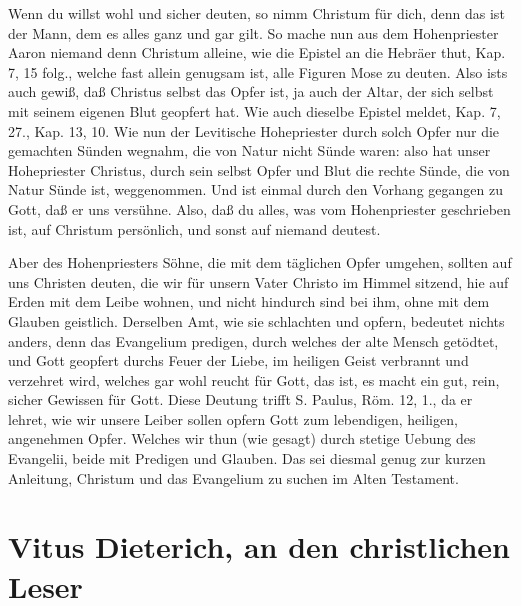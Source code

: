 Wenn du willst wohl und sicher deuten, so nimm Christum für dich, denn das ist der Mann, dem es alles ganz und gar gilt. So mache nun aus dem Hohenpriester Aaron niemand denn Christum alleine, wie die Epistel an die Hebräer thut, Kap. 7, 15 folg., welche fast allein genugsam ist, alle Figuren Mose zu deuten. Also ists auch gewiß, daß Christus selbst das Opfer ist, ja auch der Altar, der sich selbst mit seinem eigenen Blut geopfert hat. Wie auch dieselbe Epistel meldet, Kap. 7, 27., Kap. 13, 10. Wie nun der Levitische Hohepriester durch solch Opfer nur die gemachten Sünden wegnahm, die von Natur nicht Sünde waren: also hat unser Hohepriester Christus, durch sein selbst Opfer und Blut die rechte Sünde, die von Natur Sünde ist, weggenommen. Und ist einmal durch den Vorhang gegangen zu Gott, daß er uns versühne. Also, daß du alles, was vom Hohenpriester geschrieben ist, auf Christum persönlich, und sonst auf niemand deutest.

Aber des Hohenpriesters Söhne, die mit dem täglichen Opfer umgehen, sollten auf uns Christen deuten, die wir für unsern Vater Christo im Himmel sitzend, hie auf Erden mit dem Leibe wohnen, und nicht hindurch sind bei ihm, ohne mit dem Glauben geistlich. Derselben Amt, wie sie schlachten und opfern, bedeutet nichts anders, denn das Evangelium predigen, durch welches der alte Mensch getödtet, und Gott geopfert durchs Feuer der Liebe, im heiligen Geist verbrannt und verzehret wird, welches gar wohl reucht für Gott, das ist, es macht ein gut, rein, sicher Gewissen für Gott. Diese Deutung trifft S. Paulus, Röm. 12, 1., da er lehret, wie wir unsere Leiber sollen opfern Gott zum lebendigen, heiligen, angenehmen Opfer. Welches wir thun (wie gesagt) durch stetige Uebung des Evangelii, beide mit Predigen und Glauben. Das sei diesmal genug zur kurzen Anleitung, Christum und das Evangelium zu suchen im Alten Testament.


\chapter{Vitus Dieterich, an den christlichen Leser}

